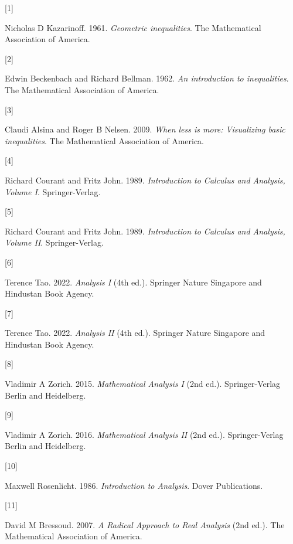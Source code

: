 \documentclass[
  a4paper,
]{article}
\newlength{\cslhangindent}
\newlength{\csllabelwidth}
\newenvironment{CSLReferences}[2] %
 {\begin{list}{}{%
  \setlength{\itemindent}{0pt}
  \setlength{\leftmargin}{0pt}
  \setlength{\parsep}{0pt}
  \ifodd #1
   \setlength{\leftmargin}{\cslhangindent}
   \setlength{\itemindent}{-1\cslhangindent}
  \fi
  \setlength{\itemsep}{#2\baselineskip}}}
 {\end{list}}
\newcommand{\CSLLeftMargin}[1]{\parbox[t]{\csllabelwidth}{\strut#1\strut}}
\newcommand{\CSLRightInline}[1]{\parbox[t]{\linewidth - \csllabelwidth}{\strut#1\strut}}
\begin{document}
\label{refs}
\begin{CSLReferences}{0}{0}
\CSLLeftMargin{{[}1{]} }%
\CSLRightInline{Nicholas D Kazarinoff. 1961. \emph{Geometric
inequalities}. The Mathematical Association of America.}

\CSLLeftMargin{{[}2{]} }%
\CSLRightInline{Edwin Beckenbach and Richard Bellman. 1962. \emph{An
introduction to inequalities}. The Mathematical Association of America.}

\CSLLeftMargin{{[}3{]} }%
\CSLRightInline{Claudi Alsina and Roger B Nelsen. 2009. \emph{When less
is more: Visualizing basic inequalities}. The Mathematical Association
of America.}

\CSLLeftMargin{{[}4{]} }%
\CSLRightInline{Richard Courant and Fritz John. 1989.
\emph{{Introduction to Calculus and Analysis, Volume I}}.
Springer-Verlag.}

\CSLLeftMargin{{[}5{]} }%
\CSLRightInline{Richard Courant and Fritz John. 1989.
\emph{{Introduction to Calculus and Analysis, Volume II}}.
Springer-Verlag.}

\CSLLeftMargin{{[}6{]} }%
\CSLRightInline{Terence Tao. 2022. \emph{{Analysis I}} (4th ed.).
{Springer Nature Singapore and Hindustan Book Agency}.}

\CSLLeftMargin{{[}7{]} }%
\CSLRightInline{Terence Tao. 2022. \emph{{Analysis II}} (4th ed.).
{Springer Nature Singapore and Hindustan Book Agency}.}

\CSLLeftMargin{{[}8{]} }%
\CSLRightInline{Vladimir A Zorich. 2015. \emph{{Mathematical Analysis
I}} (2nd ed.). {Springer-Verlag Berlin and Heidelberg}.}

\CSLLeftMargin{{[}9{]} }%
\CSLRightInline{Vladimir A Zorich. 2016. \emph{{Mathematical Analysis
II}} (2nd ed.). {Springer-Verlag Berlin and Heidelberg}.}

\CSLLeftMargin{{[}10{]} }%
\CSLRightInline{Maxwell Rosenlicht. 1986. \emph{{Introduction to
Analysis}}. Dover Publications.}

\CSLLeftMargin{{[}11{]} }%
\CSLRightInline{David M Bressoud. 2007. \emph{{A Radical Approach to
Real Analysis}} (2nd ed.). The Mathematical Association of America.}


\end{CSLReferences}
\end{document}
